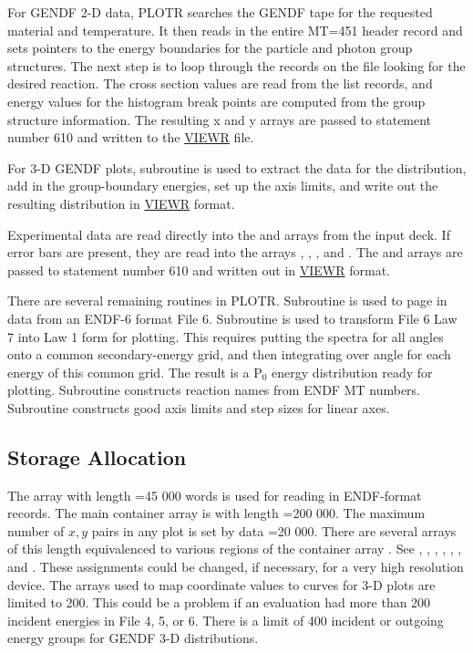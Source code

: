 For GENDF 2-D data, PLOTR searches the GENDF tape
for the requested material and temperature.  It then reads in the
entire MT=451 header record and sets pointers to the energy
boundaries for the particle and photon group structures.
The next step is to loop through the records on the file
looking for the desired reaction. The cross section values
are read from the list records, and energy values for the
histogram break points are computed from the group structure
information.  The resulting x and y arrays are passed to
statement number 610 and written to the
\hyperlink{sVIEWRhy}{VIEWR} file.

For 3-D GENDF plots, subroutine
is used to extract the data for the distribution, add in the
group-boundary energies, set up the axis limits, and write out the
resulting distribution in \hyperlink{sVIEWRhy}{VIEWR} format.

Experimental data are read directly into the  and  arrays
from the input deck.  If error bars are present, they are
read into the arrays , , ,
and .  The  and  arrays
are passed to statement number
610 and written out in \hyperlink{sVIEWRhy}{VIEWR} format.

There are several remaining routines in PLOTR.  Subroutine
is used to page in data from an ENDF-6 format File 6.
Subroutine 
is used to transform File 6 Law 7 into Law 1
form for plotting.  This requires putting the spectra for all angles
onto a common secondary-energy grid, and then integrating over angle
for each energy of this common grid.  The result is a P$_0$
energy distribution ready for plotting.  Subroutine
constructs reaction names from ENDF MT numbers.  Subroutine
constructs good axis limits and step sizes for linear axes.

\subsection{Storage Allocation}
\label{ssPLOTR_storage}

The array  with length =45 000 words is used
for reading in ENDF-format records.  The main container array is
 with length =200 000.  The
maximum number of $x,y$ pairs in any plot is set by data =20 000.
There are several arrays of this length equivalenced to various regions
of the container array .  See , ,
, , , ,
and .  These assignments could be changed,
if necessary, for a very high resolution device.  The arrays
used to map coordinate values to curves for 3-D plots are
limited to 200.  This could be a problem if an evaluation had
more than 200 incident energies in File 4, 5, or 6.   There is a
limit of 400 incident or outgoing energy groups for GENDF
3-D distributions.

